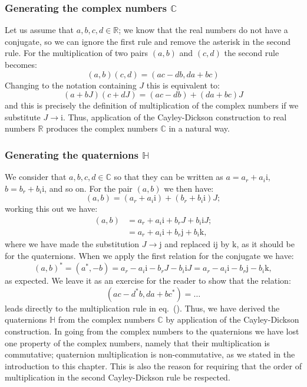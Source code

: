 \subsubsection{Generating the complex numbers $\mathbb{C}$}
Let us assume that $a,b,c,d \in\mathbb{R}$; we know that the real numbers do not have a conjugate, so we can ignore the first rule and remove the asterisk in the second rule. For the multiplication of two pairs $(a,b)$ and $(c,d)$ the second rule becomes:
\begin{equation}
	(a,b)(c,d) = (ac-db,da+bc)
\end{equation}
Changing to the notation containing $J$ this is equivalent to:
\begin{equation}
	(a+bJ)(c+dJ) = (ac-db) + (da+bc)J
\end{equation}
and this is precisely the definition of multiplication of the complex numbers if we substitute $J\rightarrow \mathrm{i}$.  Thus, application of the Cayley-Dickson construction to real numbers $\mathbb{R}$ produces the complex numbers $\mathbb{C}$ in a natural way.

\subsubsection{Generating the quaternions $\mathbb{H}$}
We consider that $a,b,c,d\in\mathbb{C}$ so that they can be written as $a= a_r+a_i\mathrm{i}$, $b=b_r+b_i\mathrm{i}$, and so on. For the pair $(a,b)$ we then have:
\begin{equation}
	(a,b) = (a_r+a_i\mathrm{i})+(b_r+b_i\mathrm{i})J;
\end{equation}
working this out we have:
\begin{equation}
\begin{split}
	(a,b) &= a_r+a_i\mathrm{i}+b_rJ+b_i\mathrm{i}J;\\
		&= a_r + a_i\mathrm{i}+b_r\mathrm{j}+b_i\mathrm{k},
\end{split}
\end{equation}
where we have made the substitution $J\rightarrow\mathrm{j}$ and replaced $\mathrm{i}\mathrm{j}$ by $\mathrm{k}$, as it should be for the quaternions.  When we apply the first relation for the conjugate we have:
\[
	(a,b)^{\ast} = (a^{\ast},-b)= a_r-a_i\mathrm{i}-b_rJ-b_i\mathrm{i}J=a_r - a_i\mathrm{i}-b_r\mathrm{j}-b_i\mathrm{k},
\]
as expected. We leave it as an exercise for the reader to show that the relation:
\[
	(ac-d^{\ast}b,da+bc^{\ast}) = \ldots
\]
leads directly to the multiplication rule in eq.~().  Thus, we have derived the quaternions $\mathbb{H}$ from the complex numbers $\mathbb{C}$ by application of the Cayley-Dickson construction.  In going from the complex numbers to the quaternions we have lost one property of the complex numbers, namely that their multiplication is commutative; quaternion multiplication is non-commutative, as we stated in the introduction to this chapter.  This is also the reason for requiring that the order of multiplication in the second Cayley-Dickson rule be respected.

